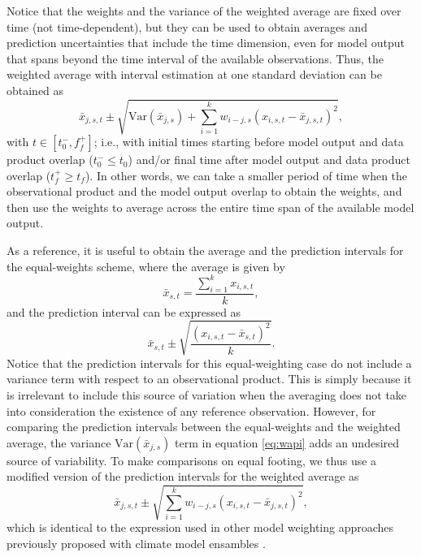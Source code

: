 \documentclass[gmd, manuscript]{copernicus}
\begin{document}
Notice that the weights and the variance of the weighted average are fixed over time (not time-dependent), but they can be used to obtain averages and prediction uncertainties that include the time dimension, even for model output that spans beyond the time interval of the available observations. Thus, the weighted average with interval estimation at one standard deviation can be obtained as \citep[c.f.][]{Rotondi2022}
\begin{equation} \label{eq:wapi}
\bar{x}_{j, s, t} \pm \sqrt{ \mathrm{Var}(\bar{x}_{j,s}) + \sum_{i=1}^k w_{i-j, s}  (x_{i, s, t} - \bar{x}_{j, s, t})^2 }, %
\end{equation}
with $t \in [t^-_0, f^+_f]$; i.e., with initial times starting before model output and data product overlap ($t^-_0 \leq t_0$) and/or final time after model output and data product overlap ($t^+_f \geq t_f$).
In other words, we can take a smaller period of time when the observational product and the model output overlap to obtain the weights, and then use the weights to average across the entire time span of the available model output. 

As a reference, it is useful to obtain the average and the prediction intervals for the equal-weights scheme, where the average is given by 
\begin{equation}
\bar{x}_{s,t} = \frac{\sum_{i=1}^k x_{i,s,t}}{k},
\end{equation}
and the prediction interval can be expressed as
\begin{equation}
\bar{x}_{s,t} \pm \sqrt{ \frac{ (x_{i,s,t} - \bar{x}_{s,t})^2 }{k}}.
\end{equation}
Notice that the prediction intervals for this equal-weighting case do not include a variance term with respect to an observational product. This is simply because it is irrelevant to include this source of variation when the averaging does not take into consideration the existence of any reference observation. However, for comparing the prediction intervals between the equal-weights and the weighted average, the variance $ \mathrm{Var}(\bar{x}_{j,s})$ term in equation \eqref{eq:wapi}  adds an undesired source of variability. To make comparisons on equal footing, we thus use a modified version of the prediction intervals for the weighted average as
\begin{equation} \label{eq:wapic2}
\bar{x}_{j, s, t} \pm \sqrt{ \sum_{i=1}^k w_{i-j, s}  (x_{i, s, t} - \bar{x}_{j, s, t})^2 }, 
\end{equation}
which is identical to the expression used in other model weighting approaches previously proposed with climate model ensambles \citep[][p. 212]{Sain2025}.
\end{document}
